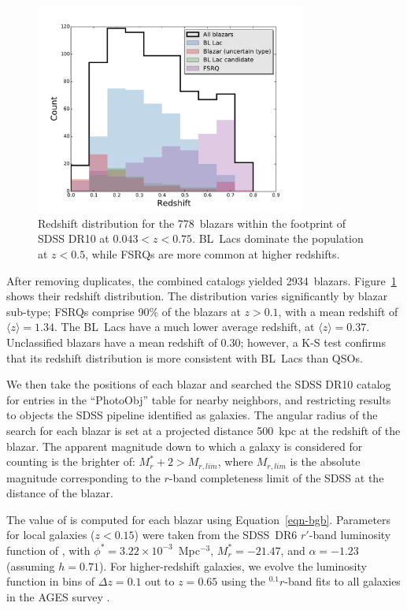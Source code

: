 \documentclass{emulateapj}
\begin{document}
\begin{figure}
\includegraphics[width=3.5in]{figures/blazars_zhist.pdf}
\caption{Redshift distribution for the 778~blazars within the footprint of SDSS DR10 at $0.043<z<0.75$. BL~Lacs dominate the population at $z<0.5$, while FSRQs are more common at higher redshifts. 
\label{fig-blazar_zhist}}
\end{figure}

After removing duplicates, the combined catalogs yielded 2934~blazars. Figure~\ref{fig-blazar_zhist} shows their redshift distribution. The distribution varies significantly by blazar sub-type; FSRQs comprise 90\% of the blazars at $z>0.1$, with a mean redshift of $\langle z\rangle=1.34$. The BL~Lacs have a much lower average redshift, at $\langle z\rangle=0.37$. Unclassified blazars \citep[``QSO candidates'', as defined by][]{mas09} have a mean redshift of 0.30; however, a K-S test confirms that its redshift distribution is more consistent with BL~Lacs than QSOs. 

We then take the positions of each blazar and searched the SDSS DR10 catalog \citep{ahn13} for entries in the ``PhotoObj'' table for nearby neighbors, and restricting results to objects the SDSS pipeline identified as galaxies. The angular radius of the search for each blazar is set at a projected distance 500~kpc at the redshift of the blazar. The apparent magnitude down to which a galaxy is considered for counting is the brighter of: $M_r^* + 2 > M_{r,lim}$, where $M_{r,lim}$ is the absolute magnitude corresponding to the $r$-band completeness limit of the SDSS at the distance of the blazar. 

The value of \bgb{} is computed for each blazar using Equation~\ref{eqn-bgb}. Parameters for local galaxies ($z<0.15$) were taken from the SDSS~DR6 $r'$-band luminosity function of \citet{mon09a}, with $\phi^*=3.22\times10^{-3}$~Mpc$^{-3}$, $M_r^*=-21.47$, and $\alpha=-1.23$ (assuming $h=0.71$). For higher-redshift galaxies, we evolve the luminosity function in bins of $\Delta z=0.1$ out to $z=0.65$ using the $^{0.1}r$-band fits to all galaxies in the AGES survey \citep{coo12}. 
\end{document}
